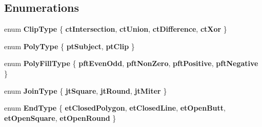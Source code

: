 \subsection*{Enumerations}
\begin{DoxyCompactItemize}
\item 
\mbox{\label{namespace_super_tiled2_unity_1_1_editor_1_1_clipper_lib_adfbc14e7fd00ae801a0308d6449dcd3f}} 
enum {\bfseries Clip\+Type} \{ {\bfseries ct\+Intersection}, 
{\bfseries ct\+Union}, 
{\bfseries ct\+Difference}, 
{\bfseries ct\+Xor}
 \}
\item 
\mbox{\label{namespace_super_tiled2_unity_1_1_editor_1_1_clipper_lib_aba7fa0de20036685a6da58a4d1446bf2}} 
enum {\bfseries Poly\+Type} \{ {\bfseries pt\+Subject}, 
{\bfseries pt\+Clip}
 \}
\item 
\mbox{\label{namespace_super_tiled2_unity_1_1_editor_1_1_clipper_lib_acd1237967fe5d5589e66e411bcd5969e}} 
enum {\bfseries Poly\+Fill\+Type} \{ {\bfseries pft\+Even\+Odd}, 
{\bfseries pft\+Non\+Zero}, 
{\bfseries pft\+Positive}, 
{\bfseries pft\+Negative}
 \}
\item 
\mbox{\label{namespace_super_tiled2_unity_1_1_editor_1_1_clipper_lib_a4b3311d5e0e2695692863b784c2bc637}} 
enum {\bfseries Join\+Type} \{ {\bfseries jt\+Square}, 
{\bfseries jt\+Round}, 
{\bfseries jt\+Miter}
 \}
\item 
\mbox{\label{namespace_super_tiled2_unity_1_1_editor_1_1_clipper_lib_abe112d4d9688280bcbb7827d55c59f98}} 
enum {\bfseries End\+Type} \{ \newline
{\bfseries et\+Closed\+Polygon}, 
{\bfseries et\+Closed\+Line}, 
{\bfseries et\+Open\+Butt}, 
{\bfseries et\+Open\+Square}, 
\newline
{\bfseries et\+Open\+Round}
 \}
\end{DoxyCompactItemize}
